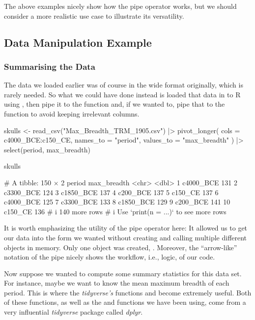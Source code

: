 The above examples nicely show how the pipe operator works, but we should consider a more realistic use case to illustrate its versatility. 

\subsection{Data Manipulation Example}

\subsubsection{Summarising the Data}

The  data we loaded earlier was of course in the wide format originally, which is rarely needed. So what we could have done instead is loaded that data in to R using , then pipe it to the  function and, if we wanted to, pipe that to the  function to avoid keeping irrelevant columns.

\begin{inR}
skulls <- read_csv("Max_Breadth_TRM_1905.csv") |>
  pivot_longer(
    cols = c4000_BCE:c150_CE,
    names_to = "period",
    values_to = "max_breadth"
  ) |>
  select(period, max_breadth)

skulls
\end{inR}
\begin{outR}
# A tibble: 150 × 2
   period    max_breadth
   <chr>           <dbl>
 1 c4000_BCE         131
 2 c3300_BCE         124
 3 c1850_BCE         137
 4 c200_BCE          137
 5 c150_CE           137
 6 c4000_BCE         125
 7 c3300_BCE         133
 8 c1850_BCE         129
 9 c200_BCE          141
10 c150_CE           136
# i 140 more rows
# i Use `print(n = ...)` to see more rows
\end{outR}

It is worth emphasizing the utility of the pipe operator here: It allowed us to get our data into the form we wanted without creating and calling multiple different objects in memory. Only one object was created, . Moreover, the ``arrow-like'' notation of the pipe \R{|>} nicely shows the workflow, i.e., logic, of our code.

Now suppose we wanted to compute some summary statistics for this data set.  For instance, maybe we want to know the mean maximum breadth of each period. This is where the \textit{tidyverse's} functions  and  become extremely useful. Both of these functions, as well as the  and  functions we have been using, come from a very influential \textit{tidyverse} package called \textit{dplyr}. 

